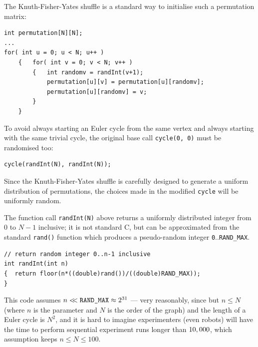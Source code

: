 \documentclass[preprint,times]{elsarticle}
\begin{document}

The Knuth-Fisher-Yates shuffle \cite[p145--146]{knuth2} is a standard way to initialise such a permutation matrix:\label{shuffle}

\begin{Verbatim}
int permutation[N][N];
...
for( int u = 0; u < N; u++ )
    {   for( int v = 0; v < N; v++ )
        {   int randomv = randInt(v+1);
            permutation[u][v] = permutation[u][randomv];
            permutation[u][randomv] = v;
        }
    }
\end{Verbatim}

To avoid always starting an Euler cycle from the same vertex and always starting with the same trivial cycle, the original base call \texttt{cycle(0, 0)} must be randomised too:

\begin{Verbatim}
cycle(randInt(N), randInt(N)); 
\end{Verbatim}

Since the Knuth-Fisher-Yates shuffle is carefully designed to generate a uniform distribution of permutations, the choices made in the modified \texttt{cycle} will be uniformly random. %

The function call \texttt{randInt(N)} above returns a uniformly distributed integer from $0$ to $N-1$ inclusive; it is not standard C, but can be approximated from the standard \texttt{rand()} function which produces a pseudo-random integer \texttt{0}..\texttt{RAND\_MAX}. 

\begin{Verbatim}
// return random integer 0..n-1 inclusive
int randInt(int n) 
{  return floor(n*((double)rand())/((double)RAND_MAX));
}
\end{Verbatim}

This code assumes $n <\!\!<\mbox{\tt RAND\_MAX}\approx 2^{31}$   \cite[p119]{knuth2} --- very reasonably, since but $n \leq N$ (where $n$ is the parameter and $N$ is the order of the graph) and the length of a Euler cycle is $N^2$, and it is hard to imagine experimenters (even robots) will have the time to perform sequential experiment runs longer than $10,\kern 0.1pt 000$, which assumption keeps $n\leq N\leq100$. 
\end{document}
